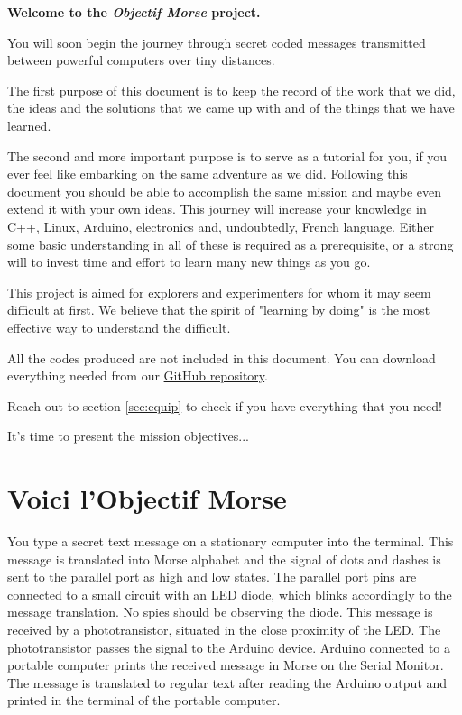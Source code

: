 \documentclass[12pt]{report}
\begin{document}
\textbf{Welcome to the \textit{Objectif Morse} project.}

You will soon begin the journey through secret coded messages transmitted between powerful computers over tiny distances.

The first purpose of this document is to keep the record of the work that we did, the ideas and the solutions that we came up with and of the things that we have learned.

The second and more important purpose is to serve as a tutorial for you, if you ever feel like embarking on the same adventure as we did. Following this document you should be able to accomplish the same mission and maybe even extend it with your own ideas. This journey will increase your knowledge in C++, Linux, Arduino, electronics and, undoubtedly, French language. Either some basic understanding in all of these is required as a prerequisite, or a strong will to invest time and effort to learn many new things as you go.

This project is aimed for explorers and experimenters for whom it may seem difficult at first. We believe that the spirit of "learning by doing" is the most effective way to understand the difficult.

All the codes produced are not included in this document. You can download everything needed from our \href{https://github.com/camillejr/objectif_morse}{GitHub repository}.

Reach out to section \ref{sec:equip} to check if you have everything that you need!

It's time to present the mission objectives...

\section{Voici l'Objectif Morse}

You type a secret text message on a stationary computer into the terminal. This message is translated into Morse alphabet and the signal of dots and dashes is sent to the parallel port as high and low states. The parallel port pins are connected to a small circuit with an LED diode, which blinks accordingly to the message translation. No spies should be observing the diode. This message is received by a phototransistor, situated in the close proximity of the LED. The phototransistor passes the signal to the Arduino device. Arduino connected to a portable computer prints the received message in Morse on the Serial Monitor. The message is translated to regular text after reading the Arduino output and printed in the terminal of the portable computer. 
\end{document}
